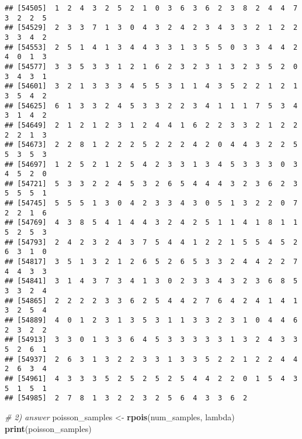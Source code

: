 \documentclass[
]{article}
\newenvironment{Shaded}{\begin{snugshade}}{\end{snugshade}}
\newcommand{\CommentTok}[1]{\textcolor[rgb]{0.56,0.35,0.01}{\textit{#1}}}
\newcommand{\FunctionTok}[1]{\textcolor[rgb]{0.13,0.29,0.53}{\textbf{#1}}}
\newcommand{\NormalTok}[1]{#1}
\newcommand{\OtherTok}[1]{\textcolor[rgb]{0.56,0.35,0.01}{#1}}
\begin{document}
\begin{verbatim}
## [54505]  1  2  4  3  2  5  2  1  0  3  6  3  6  2  3  8  2  4  4  7  3  2  2  5
## [54529]  2  3  3  7  1  3  0  4  3  2  4  2  3  4  3  3  2  1  2  2  3  3  4  2
## [54553]  2  5  1  4  1  3  4  4  3  3  1  3  5  5  0  3  3  4  4  2  4  0  1  3
## [54577]  3  3  5  3  3  1  2  1  6  2  3  2  3  1  3  2  3  5  2  0  3  4  3  1
## [54601]  3  2  1  3  3  3  4  5  5  3  1  1  4  3  5  2  2  1  2  1  3  5  4  2
## [54625]  6  1  3  3  2  4  5  3  3  2  2  3  4  1  1  1  7  5  3  4  3  1  4  2
## [54649]  2  1  2  1  2  3  1  2  4  4  1  6  2  2  3  3  2  1  2  2  2  2  1  3
## [54673]  2  2  8  1  2  2  2  5  2  2  2  4  2  0  4  4  3  2  2  5  5  3  5  3
## [54697]  1  2  5  2  1  2  5  4  2  3  3  1  3  4  5  3  3  3  0  3  4  5  2  0
## [54721]  5  3  3  2  2  4  5  3  2  6  5  4  4  4  3  2  3  6  2  3  5  5  5  1
## [54745]  5  5  5  1  3  0  4  2  3  3  4  3  0  5  1  3  2  2  0  7  2  2  1  6
## [54769]  4  3  8  5  4  1  4  4  3  2  4  2  5  1  1  4  1  8  1  1  5  2  5  3
## [54793]  2  4  2  3  2  4  3  7  5  4  4  1  2  2  1  5  5  4  5  2  6  3  1  0
## [54817]  3  5  1  3  2  1  2  6  5  2  6  5  3  3  2  4  4  2  2  7  4  4  3  3
## [54841]  3  1  4  3  7  3  4  1  3  0  2  3  3  4  3  2  3  6  8  5  3  3  2  4
## [54865]  2  2  2  2  3  3  6  2  5  4  4  2  7  6  4  2  4  1  4  1  3  2  5  4
## [54889]  4  0  1  2  3  1  3  5  3  1  1  3  3  2  3  1  0  4  4  6  2  3  2  2
## [54913]  3  3  0  1  3  3  6  4  5  3  3  3  3  3  1  3  2  4  3  3  5  2  6  1
## [54937]  2  6  3  1  3  2  2  3  3  1  3  3  5  2  2  1  2  2  4  4  2  6  3  4
## [54961]  4  3  3  3  5  2  5  2  5  2  5  4  4  2  2  0  1  5  4  3  5  1  5  1
## [54985]  2  7  8  1  3  2  2  3  2  5  6  4  3  3  6  2
\end{verbatim}

\begin{Shaded}
\begin{Highlighting}[]
\CommentTok{\# 2) answer}
\NormalTok{poisson\_samples }\OtherTok{\textless{}{-}} \FunctionTok{rpois}\NormalTok{(num\_samples, lambda)}
\FunctionTok{print}\NormalTok{(poisson\_samples)}
\end{Highlighting}
\end{Shaded}
\end{document}
